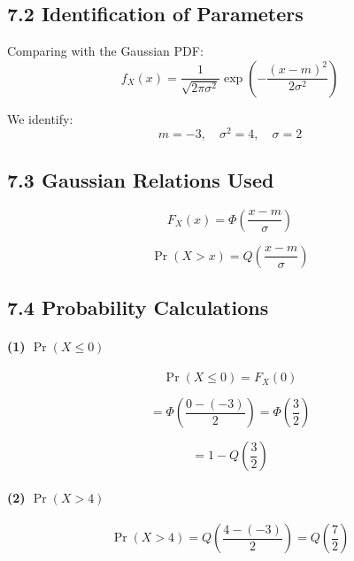 \documentclass[12pt]{article}
\begin{document}
\subsection*{7.2 Identification of Parameters}

Comparing with the Gaussian PDF:
\[
f_X(x) =
\frac{1}{\sqrt{2\pi\sigma^2}}
\exp\!\left(-\frac{(x-m)^2}{2\sigma^2}\right)
\]

We identify:
\[
m = -3,\quad \sigma^2 = 4,\quad \sigma = 2
\]

\subsection*{7.3 Gaussian Relations Used}

\[
F_X(x) =
\Phi\!\left(\frac{x-m}{\sigma}\right)
\]

\[
\Pr(X > x) =
Q\!\left(\frac{x-m}{\sigma}\right)
\]

\subsection*{7.4 Probability Calculations}

\paragraph{(1) $\Pr(X \le 0)$}

\[
\Pr(X \le 0) =
F_X(0)
\]

\[
= \Phi\!\left(\frac{0 - (-3)}{2}\right)
= \Phi\!\left(\frac{3}{2}\right)
\]

\[
= 1 - Q\!\left(\frac{3}{2}\right)
\]

\paragraph{(2) $\Pr(X > 4)$}

\[
\Pr(X > 4) =
Q\!\left(\frac{4 - (-3)}{2}\right)
= Q\!\left(\frac{7}{2}\right)
\]
\end{document}
